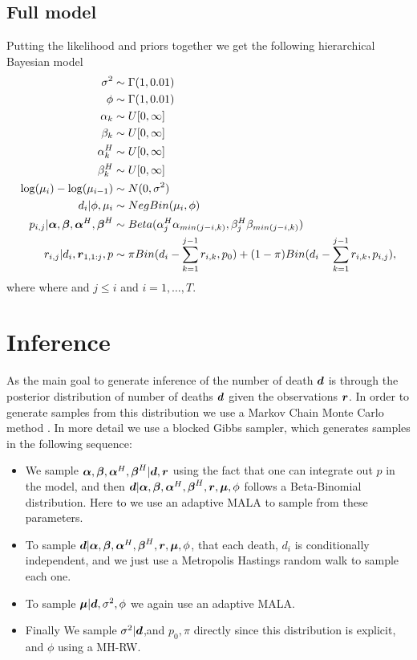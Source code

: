 \subsection{Full model}
Putting the likelihood and priors together we get the following hierarchical Bayesian model
\begin{align*}
\sigma^2 &\sim \Gamma(1,0.01) \\
\phi &\sim \Gamma(1,0.01) \\
\alpha_k &\sim U[0,\infty] \\
\beta_k &\sim U[0,\infty] \\
\alpha_k^H &\sim U[0,\infty] \\
\beta_k^H &\sim U[0,\infty] \\
\log(\mu_i) - \log(\mu_{i-1}) &\sim N(0,\sigma^2)\\
d_i| \phi,\mu_i  &\sim NegBin(\mu_i,\phi) \\
p_{i,j}|  {\boldsymbol{\alpha}},{\boldsymbol{\beta}}, {\boldsymbol{\alpha}}^H,{\boldsymbol{\beta}}^H &\sim Beta(\alpha^H_j\alpha_{min(j-i,k)},\beta^H_j\beta_{min(j-i,k)}) \\
r_{i,j}|d_i,{\boldsymbol{r}}_{1,1:j},p &\sim \pi Bin(d_i - \sum_{k=1}^{j-1}r_{i,k},p_0)+ (1-\pi) Bin(d_i - \sum_{k=1}^{j-1}r_{i,k}, p_{i,j}),
\end{align*}
where where and $j\leq i$ and $i=1,\ldots,T$.

\section{Inference}
As the main goal to generate inference of the number of death ${\boldsymbol{d}}$ is through the posterior distribution of number of deaths ${\boldsymbol{d}}$ given the observations ${\boldsymbol{r}}$.
In order to generate samples from this distribution we use a Markov Chain Monte Carlo method \citep{Brooks2011_handbook_markov}. In more detail we use a blocked Gibbs sampler, which generates samples in the following sequence:
\begin{itemize}
	\item  We sample ${\boldsymbol{\alpha}},{\boldsymbol{\beta}}, {\boldsymbol{\alpha}}^H,{\boldsymbol{\beta}}^H|{\boldsymbol{d}}, {\boldsymbol{r}}$ using the fact that one can integrate out $p$ in the model, and then  ${\boldsymbol{d}}|{\boldsymbol{\alpha}},{\boldsymbol{\beta}}, {\boldsymbol{\alpha}}^H,{\boldsymbol{\beta}}^H,{\boldsymbol{r}},{\boldsymbol{\mu}},\phi$  follows a Beta-Binomial distribution. Here to we use an adaptive MALA \citep{Atchade2006_adaptive_version} to sample from these parameters.
	\item  To sample ${\boldsymbol{d}}|{\boldsymbol{\alpha}},{\boldsymbol{\beta}}, {\boldsymbol{\alpha}}^H,{\boldsymbol{\beta}}^H,{\boldsymbol{r}},{\boldsymbol{\mu}},\phi$, that each death, $d_i$ is conditionally independent, and we just use a Metropolis Hastings random walk to sample each one.
	\item To sample ${\boldsymbol{\mu}} | {\boldsymbol{d}},\sigma^2,\phi$ we again use an adaptive MALA.
	\item Finally We sample $\sigma^2|{\boldsymbol{d}}$,and  $p_0,\pi$ directly since this distribution is explicit, and $\phi$ using a MH-RW.
\end{itemize}

